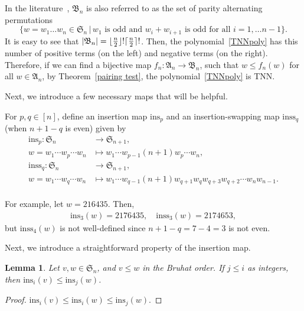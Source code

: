\documentclass[12pt]{amsart}
\DeclarePairedDelimiter\ceil{\lceil}{\rceil}
\DeclarePairedDelimiter\floor{\lfloor}{\rfloor}
\newtheorem{lem}[thm]{Lemma}
\theoremstyle{definition}
\numberwithin{equation}{section}
\newcommand{\sn}{\mathfrak{S}_n}
\newcommand{\ins}[1]{\mathrm{ins}_{#1}}
\newcommand{\inss}[1]{\mathrm{inss}_{#1}}
\begin{document}
 In the literature~\cite{TanimotoPAP}, $\mathfrak B_n$ is also referred to as the set of parity alternating permutations
 \begin{equation*}
 \{w=w_1\dotsc w_n \in \sn \,|\, w_1 \text{ is odd and } w_i+w_{i+1} \text{ is odd for all }i=1,\dotsc n-1\}.
 \end{equation*}
 It is easy to see that $|\mathfrak B_n|=\floor{\tfrac{n}{2}}! \ceil{\tfrac{n}{2}}!$.
Then, the polynomial~\eqref{TNNpoly} has this number
of positive terms (on the left) and negative terms (on the right). Therefore, if we can find a bijective map $f_n: \mathfrak A_n \rightarrow \mathfrak B_n$, such that $w \leq f_n(w) $ for all $w\in \mathfrak A_n$, by Theorem~\ref{pairing test}, the polynomial~\eqref{TNNpoly} is TNN.

Next, we introduce a few necessary maps that will be helpful.

For $p, q\in[n]$, define an insertion map $\ins p$ and an insertion-swapping map $\inss q$ (when $n+1-q$ is even) given by
\begin{equation*}
\begin{aligned}
\ins p: \sn &\to \mathfrak{S}_{n+1},\\
w= w_1 \cdots w_p \cdots w_n&\mapsto w_1\cdots w_{p-1}(n+1) w_p \cdots w_n,\\
\text{inss}_q: \sn &\to \mathfrak{S}_{n+1},\\
w= w_1 \cdots w_q \cdots w_n&\mapsto w_1 \cdots w_{q-1} (n+1) w_{q+1}w_{q}w_{q+3}w_{q+2}\cdots w_{n}w_{n-1}.\\
\end{aligned}
\end{equation*}

For example, let $w=216435$. Then, \begin{gather*}
    \ins 3(w) = 2176435, \quad \inss3(w) = 2174653,
\end{gather*}
but $\inss4(w)$ is not well-defined since $n+1-q=7-4=3$ is not even.

Next, we introduce a straightforward property of the insertion map.

\begin{lem}
    Let $v,w \in \sn$, and $v \leq w$ in the Bruhat order. If $j \leq i$ as integers, then $\ins i(v) \leq \ins j(w) $.
\end{lem}

\begin{proof}
    $\ins i(v) \leq \ins i(w) \leq \ins j(w)$.
\end{proof}
\end{document}
